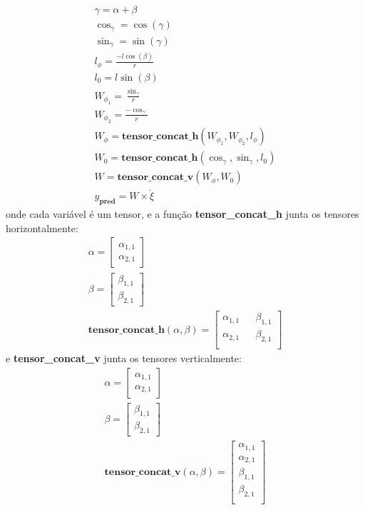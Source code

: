 \begin{align}\label{eq:grafo:computacional}
    \gamma = \alpha + \beta \\
    \cos_{\gamma} = \cos(\gamma) \\
    \sin_{\gamma} = \sin(\gamma) \\
    l_{\phi} = \frac{-l\cos(\beta)}{r} \\
    l_{0} = l\sin(\beta) \\
    W_{\phi_1} = \frac{\sin_{\gamma}}{r} \\
    W_{\phi_2} = \frac{-\cos_{\gamma}}{r} \\
    W_{\phi} = \textbf{tensor\_concat\_h}(W_{\phi_1},W_{\phi_2}, l_{\phi})\\
    W_{0} = \textbf{tensor\_concat\_h}(\cos_{\gamma},\sin_{\gamma},  l_{0}) \\
    W = \textbf{tensor\_concat\_v}( W_{\phi}, W_{0} ) \\
    y_{\textbf{pred}} =  W \times  \dot{\xi} 
\end{align}
onde cada variável é um tensor, e a
função \textbf{tensor\_concat\_h} junta os tensores horizontalmente:
\begin{align}
    \alpha = 
    \begin{bmatrix}
         \alpha_{1,1} \\
         \alpha_{2,1}
    \end{bmatrix}
    \\
    \beta =
    \begin{bmatrix}
        \beta_{1,1} \\
        \beta_{2,1}
   \end{bmatrix}\\
   \textbf{tensor\_concat\_h}( \alpha, \beta ) =
   \begin{bmatrix}
    \alpha_{1,1} && \beta_{1,1} \\
    \alpha_{2,1} &&  \beta_{2,1} \\
\end{bmatrix}
\end{align}
e \textbf{tensor\_concat\_v} junta os tensores verticalmente:
\begin{align}
    \alpha = 
    \begin{bmatrix}
         \alpha_{1,1} \\
         \alpha_{2,1}
    \end{bmatrix}
    \\
    \beta =
    \begin{bmatrix}
        \beta_{1,1} \\
        \beta_{2,1}
   \end{bmatrix}\\
   \textbf{tensor\_concat\_v}( \alpha, \beta ) =
   \begin{bmatrix}
    \alpha_{1,1} \\
    \alpha_{2,1} \\
    \beta_{1,1} \\
    \beta_{2,1} \\
\end{bmatrix}
\end{align}
